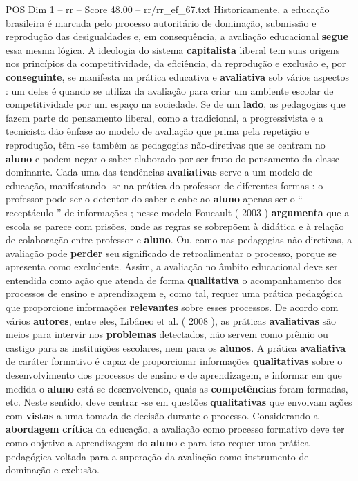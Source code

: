 \begin{textsample}{POS Dim 1 – rr – Score 48.00 – rr/rr\_ef\_67.txt}
Historicamente, a educação brasileira é marcada pelo processo autoritário de dominação, submissão e reprodução das desigualdades e, em consequência, a avaliação educacional \textbf{segue} essa mesma lógica.
A ideologia do sistema \textbf{capitalista} liberal tem suas origens nos princípios da competitividade, da eficiência, da reprodução e exclusão e, por \textbf{conseguinte}, se manifesta na prática educativa e \textbf{avaliativa} sob vários aspectos : um deles é quando se utiliza da avaliação para criar um ambiente escolar de competitividade por um espaço na sociedade.
Se de um \textbf{lado}, as pedagogias que fazem parte do pensamento liberal, como a tradicional, a progressivista e a tecnicista dão ênfase ao modelo de avaliação que prima pela repetição e reprodução, têm -se também as pedagogias não-diretivas que se centram no \textbf{aluno} e podem negar o saber elaborado por ser fruto do pensamento da classe dominante.
Cada uma das tendências \textbf{avaliativas} serve a um modelo de educação, manifestando -se na prática do professor de diferentes formas : o professor pode ser o detentor do saber e cabe ao \textbf{aluno} apenas ser o “ receptáculo ” de informações ; nesse modelo Foucault ( 2003 ) \textbf{argumenta} que a escola se parece com prisões, onde as regras se sobrepõem à didática e à relação de colaboração entre professor e \textbf{aluno}.
Ou, como nas pedagogias não-diretivas, a avaliação pode \textbf{perder} seu significado de retroalimentar o processo, porque se apresenta como excludente.
Assim, a avaliação no âmbito educacional deve ser entendida como ação que atenda de forma \textbf{qualitativa} o acompanhamento dos processos de ensino e aprendizagem e, como tal, requer uma prática pedagógica que proporcione informações \textbf{relevantes} sobre esses processos.
De acordo com vários \textbf{autores}, entre eles, Libâneo et al. ( 2008 ), as práticas \textbf{avaliativas} são meios para intervir nos \textbf{problemas} detectados, não servem como prêmio ou castigo para as instituições escolares, nem para os \textbf{alunos}.
A prática \textbf{avaliativa} de caráter formativo é capaz de proporcionar informações \textbf{qualitativas} sobre o desenvolvimento dos processos de ensino e de aprendizagem, e informar em que medida o \textbf{aluno} está se desenvolvendo, quais as \textbf{competências} foram formadas, etc.
Neste sentido, deve centrar -se em questões \textbf{qualitativas} que envolvam ações com \textbf{vistas} a uma tomada de decisão durante o processo.
Considerando a \textbf{abordagem} \textbf{crítica} da educação, a avaliação como processo formativo deve ter como objetivo a aprendizagem do \textbf{aluno} e para isto requer uma prática pedagógica voltada para a superação da avaliação como instrumento de dominação e exclusão.

\end{textsample}
